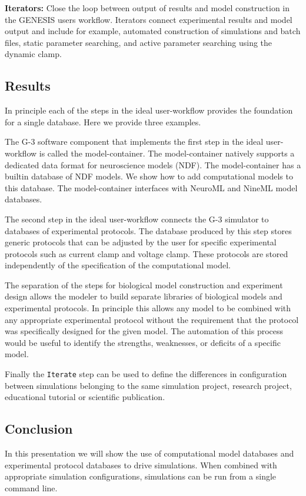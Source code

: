 \documentclass[12pt]{article}
\begin{document}
{\bf Iterators:} Close the loop between output of results and model
construction in the GENESIS users workflow. Iterators connect
experimental results and model output and include for example,
automated construction of simulations and batch files, static
parameter searching, and active parameter searching using the dynamic
clamp.

\subsection*{Results}

In principle each of the steps in the ideal user-workflow provides the
foundation for a single database.  Here we provide three examples.

The G-3 software component that implements the first step in the ideal
user-workflow is called the model-container.  The model-container
natively supports a dedicated data format for neuroscience models
(NDF).  The model-container has a builtin database of NDF models.  We
show how to add computational models to this database.  The
model-container interfaces with NeuroML and NineML model databases.

The second step in the ideal user-workflow connects the G-3 simulator
to databases of experimental protocols.  The database produced by this
step stores generic protocols that can be adjusted by the user for
specific experimental protocols such as current clamp and voltage
clamp.  These protocols are stored independently of the specification
of the computational model.

The separation of the steps for biological model construction and
experiment design allows the modeler to build separate libraries of
biological models and experimental protocols.  In principle this
allows any model to be combined with any appropriate experimental
protocol without the requirement that the protocol was specifically
designed for the given model.  The automation of this process would be
useful to identify the strengths, weaknesses, or deficits of a
specific model.

Finally the {\tt Iterate} step can be used to define the differences
in configuration between simulations belonging to the same simulation
project, research project, educational tutorial or scientific
publication.

\subsection*{Conclusion}

In this presentation we will show the use of computational model
databases and experimental protocol databases to drive simulations.
When combined with appropriate simulation configurations, simulations
can be run from a single command line.
\end{document}
